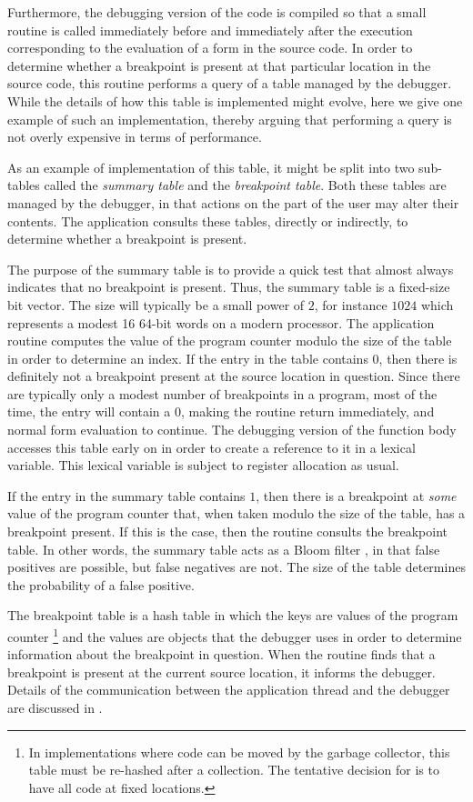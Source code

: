 Furthermore, the debugging version of the code is compiled so that a
small routine is called immediately before and immediately after the
execution corresponding to the evaluation of a form in the source
code.  In order to determine whether a breakpoint is present at that
particular location in the source code, this routine performs a query
of a table managed by the debugger.  While the details of how this
table is implemented might evolve, here we give one example of such an
implementation, thereby arguing that performing a query is not overly
expensive in terms of performance.

As an example of implementation of this table, it might be split into
two sub-tables called the \emph{summary table} and the
\emph{breakpoint table}.  Both these tables are managed by the
debugger, in that actions on the part of the user may alter their
contents.  The application consults these tables, directly or
indirectly, to determine whether a breakpoint is present.

The purpose of the summary table is to provide a quick test that
almost always indicates that no breakpoint is present.  Thus, the
summary table is a fixed-size bit vector.  The size will typically be
a small power of $2$, for instance $1024$ which represents a modest 16
64-bit words on a modern processor.  The application routine computes
the value of the program counter modulo the size of the table in order
to determine an index.  If the entry in the table contains $0$, then
there is definitely not a breakpoint present at the source location in
question.  Since there are typically only a modest number of
breakpoints in a program, most of the time, the entry will contain a
$0$, making the routine return immediately, and normal form evaluation
to continue.  The debugging version of the function body accesses this
table early on in order to create a reference to it in a lexical
variable.  This lexical variable is subject to register allocation as
usual.

If the entry in the summary table contains $1$, then there is a
breakpoint at \emph{some} value of the program counter that, when
taken modulo the size of the table, has a breakpoint present.  If this
is the case, then the routine consults the breakpoint table.  In other
words, the summary table acts as a Bloom filter
\cite{10.1145:362686.362692}, in that false positives are possible,
but false negatives are not.  The size of the table determines the
probability of a false positive.

The breakpoint table is a hash table in which the keys are values of
the program counter%
\footnote{In implementations where code can be moved by the garbage
  collector, this table must be re-hashed after a collection.  The
  tentative decision for \sicl{} is to have all code at fixed locations.}
and the values are objects that the debugger uses in order to
determine information about the breakpoint in question.  When the
routine finds that a breakpoint is present at the current source
location, it informs the debugger.  Details of the communication
between the application thread and the debugger are discussed in
.

